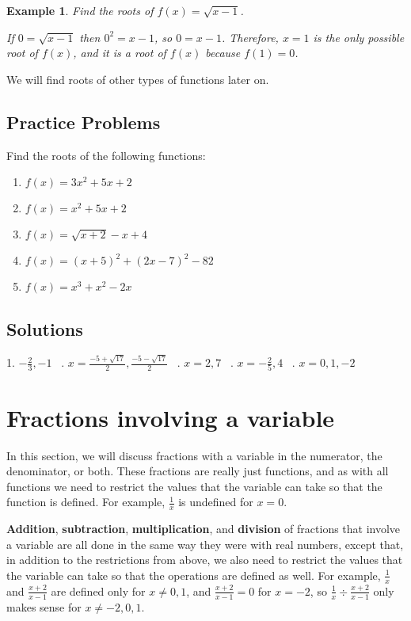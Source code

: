 \documentclass[11pt]{book}               %
\newtheorem{example}{Example}
\begin{document}
\begin{example} Find the roots of $ f(x) = \sqrt{x-1} $.

\normalfont

If $0=\sqrt{x-1}$ then $0^2=x-1$, so $0=x-1$. Therefore, $x=1$ is the only possible root of $f(x)$, and it is a root of $f(x)$ because $f(1) = 0$. 

\end{example}

We will find roots of other types of functions later on. 

\subsection{Practice Problems}

Find the roots of the following functions:
\begin{enumerate}
\item $ f(x)=3x^2+5x+2 $ 
\item $f(x)= x^2+5x+2 $ 
\item $f(x)= \sqrt{x+2} -x +4 $ 
\item $f(x)=(x+5)^2 +(2x-7)^2-82 $ 
\item $f(x)= x^3 + x^2 - 2x$
\end{enumerate}

\subsection{Solutions} 
1.  $-\frac{2}{3}, -1 $ \  .  $ x=\frac{-5 + \sqrt{17}}{2}, \frac{-5 - \sqrt{17}}{2}$ \ .  $x=2,7 $ \  .  $ x=-\frac{2}{5},4 $ \ . $x=0,1,-2 $ \ \quad

\newpage
\label{section_fractions_variables}
\section{Fractions involving a variable}
In this section, we will discuss fractions with a variable in the numerator, the denominator, or both. 
These fractions are really just functions, and as with all functions we need to restrict the values that the variable can take so that the function is defined.
For example, $\frac{1}{x}$ is undefined for $x=0$. 

\textbf{Addition}, \textbf{subtraction}, \textbf{multiplication}, and \textbf{division} of fractions that involve a variable are all done in the same way they were with real numbers, except that, in addition to the restrictions from above, we also need to restrict the values that the variable can take so that the operations are defined as well.
For example, $\frac{1}{x}$ and  $\frac{x+2}{x-1}$ are defined only for $x\neq0,1$, and $\frac{x+2}{x-1}=0$ for $x=-2$, so $\frac{1}{x}\div\frac{x+2}{x-1}$ only makes sense for $x\neq-2,0,1$.
\end{document}
